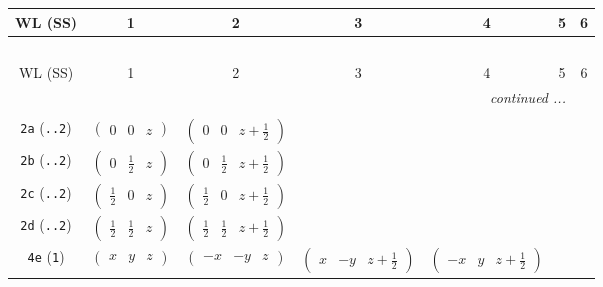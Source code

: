 \documentclass[fleqn,9pt,landscape]{jsarticle}
\begin{document}
\begin{center}
\renewcommand{\arraystretch}{1.2}
\begin{longtable}{ccccccc}
 \hline \hline
WL (SS) & 1 & 2 & 3 & 4 & 5 & 6 \\ \hline \endfirsthead

\multicolumn{6}{l}{\tablename\ \thetable{}} \\
 \hline \hline
WL (SS) & 1 & 2 & 3 & 4 & 5 & 6 \\ \hline \endhead

 \hline \hline
\multicolumn{6}{r}{\footnotesize\it continued ...} \\ \endfoot

 \hline \hline
\multicolumn{6}{r}{} \\ \endlastfoot

{\tt 2a} ({\tt ..2}) & $ \begin{pmatrix} 0 & 0 & z \end{pmatrix} $ & $ \begin{pmatrix} 0 & 0 & z + \frac{1}{2} \end{pmatrix} $ & $  $ & $  $ \\ \hline
{\tt 2b} ({\tt ..2}) & $ \begin{pmatrix} 0 & \frac{1}{2} & z \end{pmatrix} $ & $ \begin{pmatrix} 0 & \frac{1}{2} & z + \frac{1}{2} \end{pmatrix} $ & $  $ & $  $ \\ \hline
{\tt 2c} ({\tt ..2}) & $ \begin{pmatrix} \frac{1}{2} & 0 & z \end{pmatrix} $ & $ \begin{pmatrix} \frac{1}{2} & 0 & z + \frac{1}{2} \end{pmatrix} $ & $  $ & $  $ \\ \hline
{\tt 2d} ({\tt ..2}) & $ \begin{pmatrix} \frac{1}{2} & \frac{1}{2} & z \end{pmatrix} $ & $ \begin{pmatrix} \frac{1}{2} & \frac{1}{2} & z + \frac{1}{2} \end{pmatrix} $ & $  $ & $  $ \\ \hline
{\tt 4e} ({\tt 1}) & $ \begin{pmatrix} x & y & z \end{pmatrix} $ & $ \begin{pmatrix} - x & - y & z \end{pmatrix} $ & $ \begin{pmatrix} x & - y & z + \frac{1}{2} \end{pmatrix} $ & $ \begin{pmatrix} - x & y & z + \frac{1}{2} \end{pmatrix} $ \\
\end{longtable}
\end{center}
\end{document}
